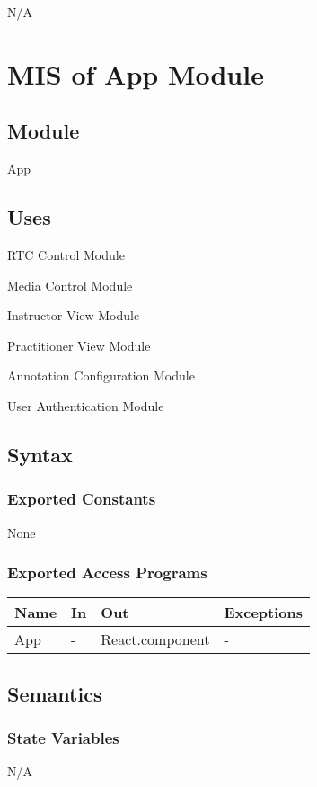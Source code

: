 \documentclass[12pt, titlepage]{article}
\begin{document}
N/A


\section{MIS of App Module} \label{sec:appmodule}

\subsection{Module}
App

\subsection{Uses}
RTC Control Module

Media Control Module

Instructor View Module

Practitioner View Module

Annotation Configuration Module

User Authentication Module

\subsection{Syntax}

\subsubsection{Exported Constants}
None

\subsubsection{Exported Access Programs}
\begin{table}[h!]
  \centering
  \begin{tabular}{llll}
    \hline
    \textbf{Name} & \textbf{In} & \textbf{Out}          & \textbf{Exceptions} \\
    \hline
    App     & -     & React.component & -             \\
    \hline
  \end{tabular}
\end{table}

\subsection{Semantics}

\subsubsection{State Variables}
N/A
\end{document}

